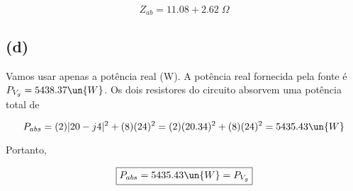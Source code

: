 \[ \boxed{Z_{ab} = 11.08 + 2.62 \;\Omega} \]

\subsection*{(d)}

Vamos usar apenas a potência real (W). A potência real fornecida pela fonte é $P_{V_g} = 5438.37 \un{W}$. Os dois resistores
do circuito absorvem uma potência total de 

\[ P_{abs} = (2)|20 - j4|^2 + (8)(24)^2 = (2)(20.34)^2 + (8)(24)^2 = 5435.43 \un{W}  \]

Portanto, 

\[ \boxed{P_{abs} = 5435.43 \un{W} = P_{V_g}} \]









